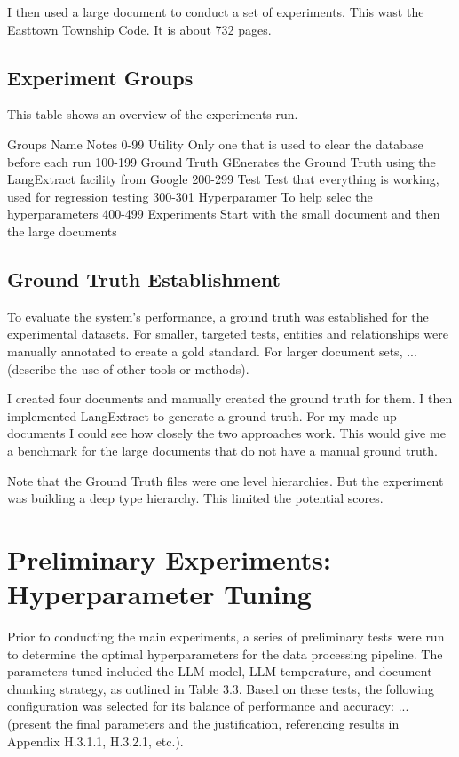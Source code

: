 I then used a large document to conduct a set of experiments. This wast the Easttown Township Code. It is about 732 pages.




\subsection{Experiment Groups}

This table shows an overview of the experiments run.

Groups  Name    Notes
0-99    Utility Only one that is used to clear the database before each run
100-199 Ground Truth    GEnerates the Ground Truth using the LangExtract facility from Google
200-299 Test    Test that everything is working, used for regression testing
300-301 Hyperparamer    To help selec the hyperparameters
400-499 Experiments Start with the small document and then the large documents

\subsection{Ground Truth Establishment}
To evaluate the system's performance, a ground truth was established for the experimental datasets. For smaller, targeted tests, entities and relationships were manually annotated to create a gold standard. For larger document sets, ... (describe the use of other tools or methods).

I created four documents and manually created the ground truth for them. I then implemented LangExtract to generate a ground truth. For my made up documents I could see how closely the two approaches work. This would give me a benchmark for the large documents that do not have a manual ground truth.

Note that the Ground Truth files were one level hierarchies. But the experiment was building a deep type hierarchy. This limited the potential scores.

\section{Preliminary Experiments: Hyperparameter Tuning}
\label{sec:hyperparameter_tuning}
Prior to conducting the main experiments, a series of preliminary tests were run to determine the optimal hyperparameters for the data processing pipeline. The parameters tuned included the LLM model, LLM temperature, and document chunking strategy, as outlined in Table 3.3. Based on these tests, the following configuration was selected for its balance of performance and accuracy: ... (present the final parameters and the justification, referencing results in Appendix H.3.1.1, H.3.2.1, etc.).

